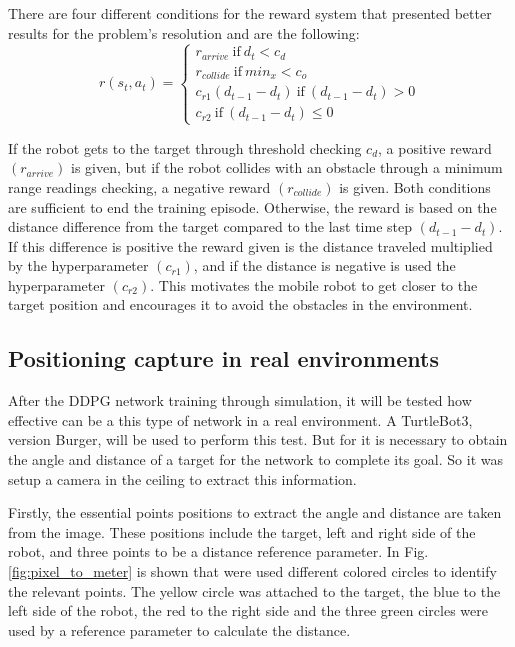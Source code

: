 There are four different conditions for the reward system that presented better results for the problem's resolution and are the following:
\begin{equation}
r (s_t, a_t) = 
\begin{cases}
r_{arrive} \ \textrm{if} \ d_t < c_d
\\
r_{collide} \ \textrm{if}\ min_x < c_o
\\
c_{r1}(d_{t-1} - d_t) \ \textrm{if} \ (d_{t-1} - d_t) > 0
\\
c_{r2} \ \textrm{if} \ (d_{t-1} - d_t) \leq 0
\end{cases}
\end{equation}

If the robot gets to the target through threshold checking $c_d$, a positive reward $(r_{arrive})$ is given, but if the robot collides with an obstacle through a minimum range readings checking, a negative reward $(r_{collide})$ is given.
Both conditions are sufficient to end the training episode.
Otherwise, the reward is based on the distance difference from the target compared to the last time step $(d_{t-1} - d_t)$. 
If this difference is positive the reward given is the distance traveled multiplied by the hyperparameter $(c_{r1})$, and if the distance is negative is used the hyperparameter $(c_{r2})$.
This motivates the mobile robot to get closer to the target position and encourages it to avoid the obstacles in the environment.

\subsection*{Positioning capture in real environments}

After the DDPG network training through simulation, it will be tested how effective can be a this type of network in a real environment.
A TurtleBot3, version Burger, will be used to perform this test. But for it is necessary to obtain the angle and distance of a target for the network to complete its goal. So it was setup a camera in the ceiling to extract this information.

Firstly, the essential points positions to extract the angle and distance are taken from the image.
These positions include the target, left and right side of the robot, and three points to be a distance reference parameter.
In Fig. \ref{fig:pixel_to_meter} is shown that were used different colored circles to identify the relevant points.
The yellow circle was attached to the target, the blue to the left side of the robot, the red to the right side and the three green circles were used by a reference parameter to calculate the distance.

